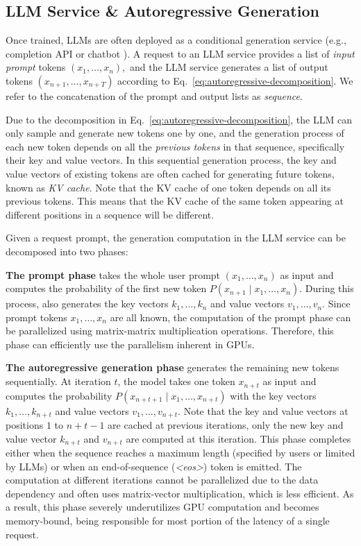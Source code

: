 \documentclass[sigplan,10pt]{acmart}
\newcommand{\heading}[1]{\vspace{4pt}\noindent\textbf{#1}}
\begin{document}
\subsection{LLM Service \& Autoregressive Generation}

Once trained, LLMs are often deployed as a conditional generation service (e.g., completion API \cite{openaiapi} or chatbot \cite{chatgpt, bard}). A request to an LLM service provides a list of \emph{input prompt} tokens $(x_1, \ldots, x_n),$ and the LLM service generates a list of output tokens $(x_{n+1}, \ldots, x_{n+T})$ according to Eq.~\ref{eq:autoregressive-decomposition}. We refer to the concatenation of the prompt and output lists as \emph{sequence}. 

Due to the decomposition in Eq.~\ref{eq:autoregressive-decomposition}, the LLM can only sample and generate new tokens one by one, and the generation process of each new token depends on all the \emph{previous tokens} in that sequence, specifically their key and value vectors. In this sequential generation process, the key and value vectors of existing tokens are often cached for generating future tokens, known as \emph{KV cache}. Note that the KV cache of one token depends on all its previous tokens. This means that the KV cache of the same token appearing at different positions in a sequence will be different. 

Given a request prompt, the generation computation in the LLM service can be decomposed into two phases:

\heading{The prompt phase} takes the whole user prompt $(x_1, \ldots, x_n)$ as input and computes the probability of the first new token $P(x_{n+1} \mid x_1, \ldots, x_{n})$. During this process, also generates the key vectors $k_1, \ldots, k_n$ and value vectors $v_1, \ldots, v_n$.
Since prompt tokens $x_1, \ldots, x_n$ are all known, the computation of the prompt phase can be parallelized using matrix-matrix multiplication operations.
Therefore, this phase can efficiently use the parallelism inherent in GPUs.

\heading{The autoregressive generation phase} generates the remaining new tokens sequentially. 
At iteration $t$, the model takes one token $x_{n+t}$ as input and computes the probability $P(x_{n+t+1} \mid x_1, \ldots, x_{n+t})$ with the key vectors $k_1, \ldots, k_{n+t}$ and value vectors $v_1, \ldots, v_{n+t}$. Note that the key and value vectors at positions $1$ to $n + t - 1$ are cached at previous iterations, only the new key and value vector $k_{n+t}$ and $v_{n+t}$ are computed at this iteration. This phase completes either when the sequence reaches a maximum length (specified by users or limited by LLMs) or when an end-of-sequence (\emph{<eos>}) token is emitted.
The computation at different iterations cannot be parallelized due to the data dependency and often uses matrix-vector multiplication, which is less efficient. 
As a result, this phase severely underutilizes GPU computation and becomes memory-bound, being responsible for most portion of the latency of a single request.
\end{document}
